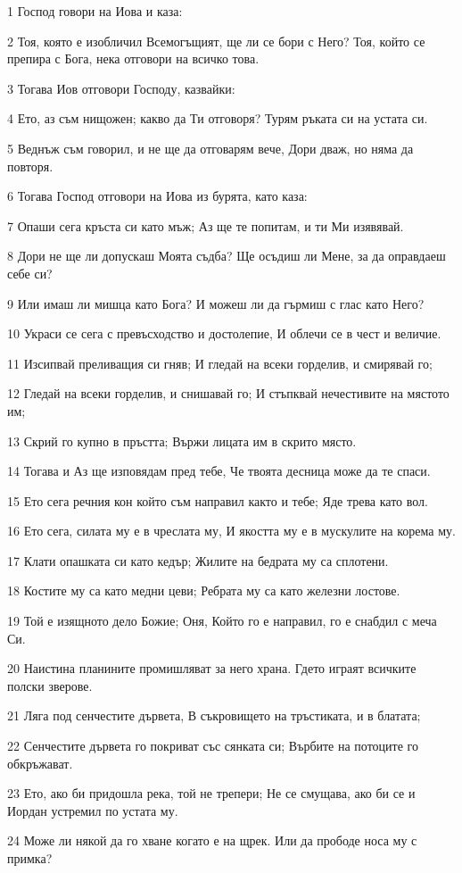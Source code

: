 \par 1 Господ говори на Иова и каза:
\par 2 Тоя, която е изобличил Всемогъщият, ще ли се бори с Него? Тоя, който се препира с Бога, нека отговори на всичко това.
\par 3 Тогава Иов отговори Господу, казвайки:
\par 4 Ето, аз съм нищожен; какво да Ти отговоря? Турям ръката си на устата си.
\par 5 Веднъж съм говорил, и не ще да отговарям вече, Дори дваж, но няма да повторя.
\par 6 Тогава Господ отговори на Иова из бурята, като каза:
\par 7 Опаши сега кръста си като мъж; Аз ще те попитам, и ти Ми изявявай.
\par 8 Дори не ще ли допускаш Моята съдба? Ще осъдиш ли Мене, за да оправдаеш себе си?
\par 9 Или имаш ли мишца като Бога? И можеш ли да гърмиш с глас като Него?
\par 10 Украси се сега с превъсходство и достолепие, И облечи се в чест и величие.
\par 11 Изсипвай преливащия си гняв; И гледай на всеки горделив, и смирявай го;
\par 12 Гледай на всеки горделив, и снишавай го; И стъпквай нечестивите на мястото им;
\par 13 Скрий го купно в пръстта; Вържи лицата им в скрито място.
\par 14 Тогава и Аз ще изповядам пред тебе, Че твоята десница може да те спаси.
\par 15 Ето сега речния кон който съм направил както и тебе; Яде трева като вол.
\par 16 Ето сега, силата му е в чреслата му, И якостта му е в мускулите на корема му.
\par 17 Клати опашката си като кедър; Жилите на бедрата му са сплотени.
\par 18 Костите му са като медни цеви; Ребрата му са като железни лостове.
\par 19 Той е изящното дело Божие; Оня, Който го е направил, го е снабдил с меча Си.
\par 20 Наистина планините промишляват за него храна. Гдето играят всичките полски зверове.
\par 21 Ляга под сенчестите дървета, В съкровището на тръстиката, и в блатата;
\par 22 Сенчестите дървета го покриват със сянката си; Върбите на потоците го обкръжават.
\par 23 Ето, ако би придошла река, той не трепери; Не се смущава, ако би се и Иордан устремил по устата му.
\par 24 Може ли някой да го хване когато е на щрек. Или да прободе носа му с примка?

